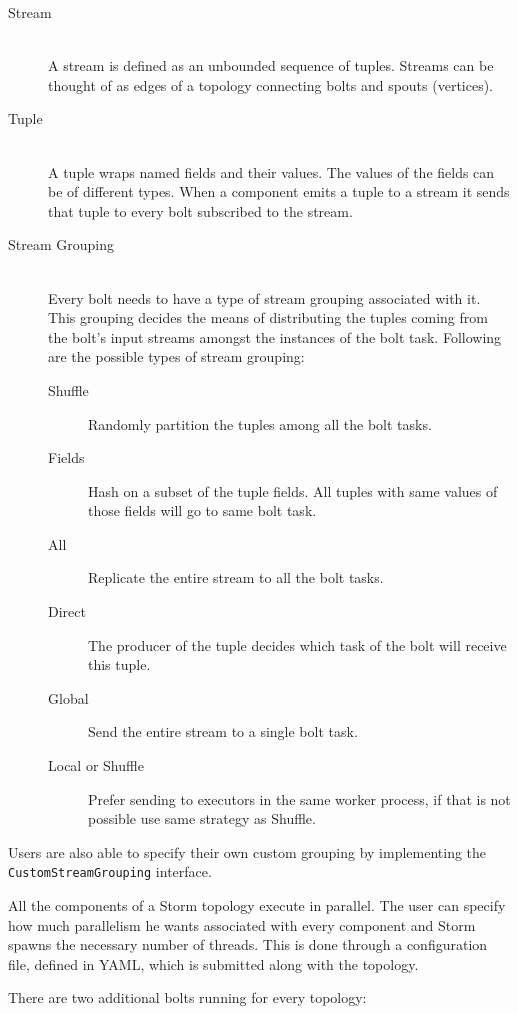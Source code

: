 \documentclass[bsc,logo,frontabs,twoside,singlespacing,normalheadings,parskip]{infthesis}\usepackage[]{graphicx}\usepackage[]{color}
\begin{document}
\begin{description}
  \item[Stream] \hfill \\
  A stream is defined as an unbounded sequence of tuples. Streams can be thought of as edges of a topology connecting bolts and spouts (vertices).
  \item[Tuple] \hfill \\
  A tuple wraps named fields and their values. The values of the fields can be of different types. When a component emits a tuple to a stream it sends that tuple to every bolt subscribed to the stream.
  \item[Stream Grouping] \hfill \\
  Every bolt needs to have a type of stream grouping associated with it. This grouping decides the means of distributing the tuples coming from the bolt's input streams amongst the instances of the bolt task. Following are the possible types of stream grouping:
  \begin{description}
  	\item[Shuffle] Randomly partition the tuples among all the bolt tasks.
  	\item[Fields] Hash on a subset of the tuple fields. All tuples with same values of those fields will go to same bolt task.
  	\item[All] Replicate the entire stream to all the bolt tasks.
  	\item[Direct] The producer of the tuple decides which task of the bolt will receive this tuple.
  	\item[Global] Send the entire stream to a single bolt task.
  	\item[Local or Shuffle] Prefer sending to executors in the same worker process, if that is not possible use same strategy as Shuffle.
  \end{description}
\end{description}

Users are also able to specify their own custom grouping by implementing the \texttt{CustomStreamGrouping} interface.

All the components of a Storm topology execute in parallel. The user can specify how much parallelism he wants associated with every component and Storm spawns the necessary number of threads. This is done through a configuration file, defined in YAML, which is submitted along with the topology.

There are two additional bolts running for every topology:
\end{document}
